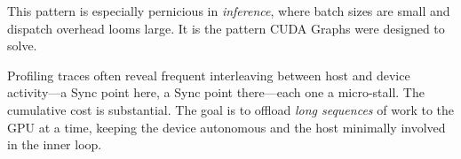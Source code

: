 \documentclass[11pt,a4paper]{article}
\theoremstyle{definition}
\theoremstyle{remark}
\theoremstyle{plain}
\begin{document}
This pattern is especially pernicious in \emph{inference}, where batch
sizes are small and dispatch overhead looms large. It is the pattern CUDA
Graphs were designed to solve.

Profiling traces often reveal frequent interleaving between host and
device activity---a Sync point here, a Sync point there---each one a
micro-stall. The cumulative cost is substantial. The goal is to offload
\emph{long sequences} of work to the GPU at a time, keeping the device
autonomous and the host minimally involved in the inner loop.
\end{document}
